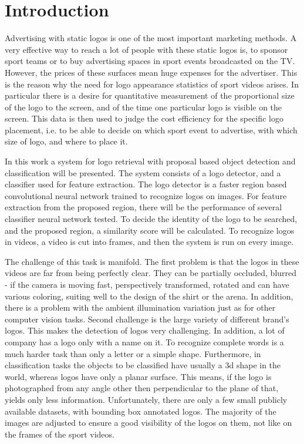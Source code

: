 \chapter{Introduction}\label{c:intro}

Advertising with static logos is one of the most important marketing methods. A very effective way to reach a lot of people with these static logos is, to sponsor sport teams or to buy advertising spaces in sport events broadcasted on the TV. However, the prices of these surfaces mean huge expenses for the advertiser. This is the reason why the need for logo appearance statistics of sport videos arises. In particular there is a desire for quantitative measurement of the proportional size of the logo to the screen, and of the time one particular logo is visible on the screen. This data is then used to judge the cost efficiency for the specific logo placement, i.e. to be able to decide on which sport event to advertise, with which size of logo, and where to place it.

In this work a system for logo retrieval with proposal based object detection and classification will be presented. The system consists of a logo detector, and a classifier used for feature extraction. The logo detector is a faster region based convolutional neural network \cite{NIPS2015_5638} trained to recognize logos on images. For feature extraction from the proposed region, there will be the performance of several classifier neural network tested. To decide the identity of the logo to be searched, and the proposed region, a similarity score will be calculated. To recognize logos in videos, a video is cut into frames, and then the system is run on every image.

The challenge of this task is manifold. The first problem is that the logos in these videos are far from being perfectly clear. They can be partially occluded, blurred - if the camera is moving fast, perspectively transformed, rotated and can have various coloring, suiting well to the design of the shirt or the arena. In addition, there is a problem with the ambient illumination variation just as for other computer vision tasks.
Second challenge is the large variety of different brand's logos. This makes the detection of logos very challenging. In addition, a lot of company has a logo only with a name on it. To recognize complete words is a much harder task than only a letter or a simple shape.
Furthermore, in classification tasks the objects to be classified have usually a 3d shape in the world, whereas logos have only a planar surface. This means, if the logo is photographed from any angle other then perpendicular to the plane of that, yields only less information.
Unfortunately, there are only a few small publicly available datasets, with bounding box annotated logos. The majority of the images are adjusted to ensure a good visibility of the logos on them, not like on the frames of the sport videos.

